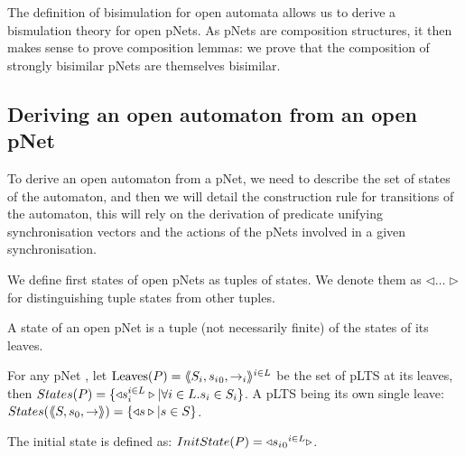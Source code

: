 \documentclass{lncs/llncs}
\begin{document}
The definition of bisimulation for open automata allows us to derive a bismulation theory for open pNets. As pNets are composition structures, it then makes sense to prove composition lemmas: we prove that the composition of strongly bisimilar pNets are themselves bisimilar.

\subsection{Deriving an open automaton from an open pNet}
To derive an open automaton from a pNet, we need to describe the set of states of the automaton, and then we will detail the construction rule for transitions of the automaton, this will rely on the derivation of predicate unifying synchronisation vectors and the actions of the pNets involved in a given synchronisation.


We define first states of open pNets as tuples of states. We denote them
 as $\triangleleft\ldots\triangleright$ for distinguishing tuple 
states from other tuples.
\begin{definition}\label{def-states}
  A state of an open pNet is a tuple (not necessarily finite) of the
  states of its leaves.

  For any pNet \pNet, let $\operatorname{Leaves}(P) = \langle\hspace{-0.58ex}\langle S_i,{s_i}_0, \to_i\rangle\hspace{-0.58ex}\rangle^{i \in L}$ be 
  the set of pLTS at its leaves,
  then $States(P) = \{\triangleleft s_i^{i\in L}
  \triangleright| \forall i\in L. s_i \in S_i\}$.
A pLTS being its own single leave:
  $States(\langle\hspace{-0.58ex}\langle S,s_0, \to\rangle\hspace{-0.58ex}\rangle) = \{\triangleleft s \triangleright| s \in S\}$.

The initial state is defined as:
$InitState(P) = \triangleleft {{s_i}_0}^{i\in L}  \triangleright$.
\end{definition}



\end{document}
